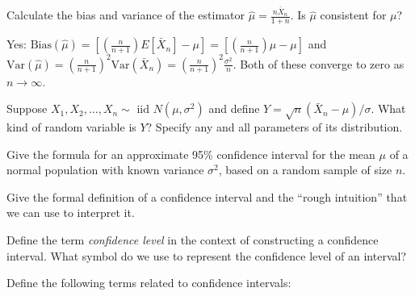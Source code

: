 \documentclass[addpoints,12pt]{exam}
\begin{document}
\begin{questions}
\question Calculate the bias and variance of the estimator  $\widehat{\mu} = \displaystyle\frac{n \bar{X}_n}{1 + n}$.
Is $\widehat{\mu}$ consistent for $\mu$? 
\begin{solution}
  Yes: $\mbox{Bias}(\widehat{\mu}) = \left[ \left( \frac{n}{n+1} \right)E[\bar{X}_n] - \mu\right] = \left[ \left( \frac{n}{n+1} \right)\mu  - \mu\right]$ and $\mbox{Var}(\widehat{\mu}) = \left( \frac{n}{n+1} \right)^2 \mbox{Var}(\bar{X}_n) = \left( \frac{n}{n+1} \right)^2 \frac{\sigma^2}{n}$.
  Both of these converge to zero as $n \rightarrow \infty$.
\end{solution}


\question Suppose $X_1, X_2, \dots, X_n \sim \text{ iid } N(\mu, \sigma^2)$ and define $Y = \sqrt{n}(\bar{X}_n - \mu)/\sigma$. What kind of random variable is $Y$? Specify any and all parameters of its distribution.

\question Give the formula for an approximate 95\% confidence interval for the mean $\mu$ of a normal population with known variance $\sigma^2$, based on a random sample of size $n$.

\question Give the formal definition of a confidence interval and the ``rough intuition'' that we can use to interpret it.

\question Define the term \emph{confidence level} in the context of constructing a confidence interval. What symbol do we use to represent the confidence level of an interval?

\question Define the following terms related to confidence intervals:


\end{questions}
\end{document}
